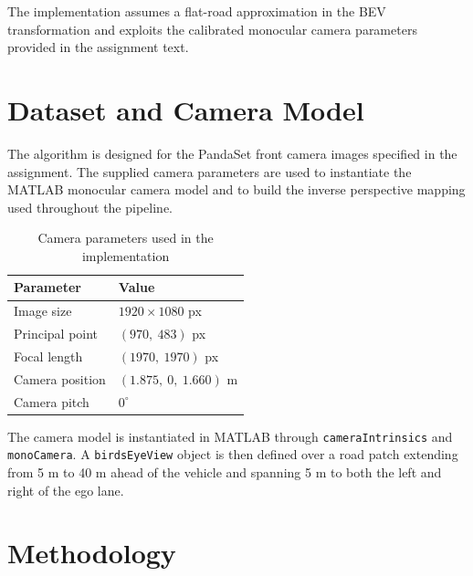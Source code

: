 \documentclass[conference]{IEEEtran}
\begin{document}
The implementation assumes a flat-road approximation in the BEV transformation and exploits the calibrated monocular camera parameters provided in the assignment text.

\section{Dataset and Camera Model}
The algorithm is designed for the PandaSet front camera images specified in the assignment. The supplied camera parameters are used to instantiate the MATLAB monocular camera model and to build the inverse perspective mapping used throughout the pipeline.

\begin{table}[htbp]
\caption{Camera parameters used in the implementation}
\label{tab:camera}
\centering
\begin{tabular}{ll}
\toprule
Parameter & Value \\
\midrule
Image size & $1920 \times 1080$ px \\
Principal point & $(970,\ 483)$ px \\
Focal length & $(1970,\ 1970)$ px \\
Camera position & $(1.875,\ 0,\ 1.660)$ m \\
Camera pitch & $0^\circ$ \\
\bottomrule
\end{tabular}
\end{table}

The camera model is instantiated in MATLAB through \texttt{cameraIntrinsics} and \texttt{monoCamera}. A \texttt{birdsEyeView} object is then defined over a road patch extending from 5 m to 40 m ahead of the vehicle and spanning 5 m to both the left and right of the ego lane.

\section{Methodology}
\end{document}

